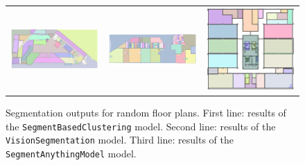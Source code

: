 \documentclass[11pt]{article}
\begin{document}
\begin{figure}[hp]
\begin{tabular}{ccc}
        \includegraphics[width=0.3\linewidth]{figures/SAM_pred-1.png} &
        \includegraphics[width=0.3\linewidth]{figures/SAM_pred-2.png} &
        \includegraphics[width=0.3\linewidth]{figures/SAM_pred-3.png} \\
    \end{tabular}
    \caption{Segmentation outputs for random floor plans.
    First line: results of the \texttt{SegmentBasedClustering} model.
    Second line: results of the \texttt{VisionSegmentation} model.
    Third line: results of the \texttt{SegmentAnythingModel} model.}
    \label{fig:segmentation_results}
\end{figure}

\end{document}
